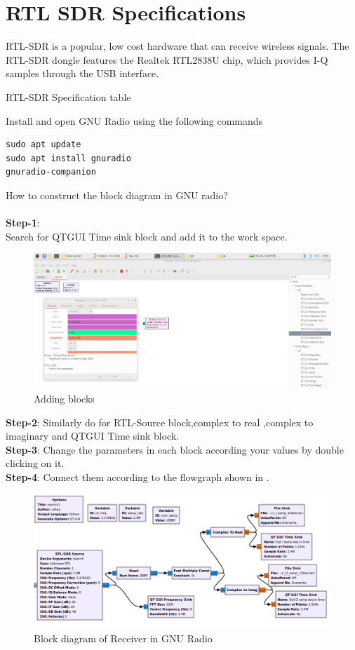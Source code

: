 \documentclass[11pt]{book}
\begin{document}
\section{RTL SDR Specifications}
RTL-SDR is a popular, low cost hardware that can receive wireless signals. The RTL-SDR dongle features the Realtek RTL2838U chip, which provides I-Q samples through the USB interface. 
\begin{table}[!ht]
  \centering
 
  \caption{RTL-SDR Specification table }
  \label{tab:rxcomponents}
\end{table}

 Install and open GNU Radio using the following commands
\\
\begin{lstlisting}
sudo apt update
sudo apt install gnuradio
gnuradio-companion
\end{lstlisting}
 How to construct the block diagram in GNU radio? \\
	\solution  \\
\textbf{Step-1}:\\
Search for QTGUI Time sink  block and add it to the work space.
\begin{figure}[H]
\centering
\includegraphics[width=\columnwidth]{figs/add.png}
\caption{Adding blocks}
\label{fig:add blocks}
\end{figure}
\textbf{Step-2}:
Similarly do for RTL-Source block,complex to real ,complex to imaginary and QTGUI Time sink block.
\\
\textbf{Step-3}:
Change the parameters in each block according your values by double clicking on it.
\\
\textbf{Step-4}:
Connect them according to the flowgraph shown in .
\begin{figure}[H]
\centering
\includegraphics[width=\columnwidth]{figs/RTL_SDR_test.png}
\caption{Block diagram of Receiver in GNU Radio}
\label{fig:Rx_Block_diagram}
\end{figure}
\end{document}
